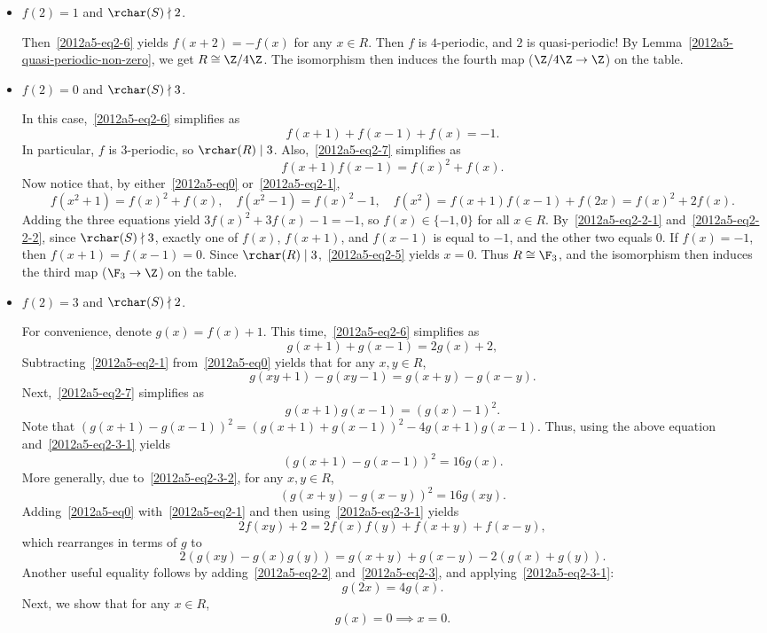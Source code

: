 \begin{itemize}

    \item 
    $f(2) = 1$ and $\rchar(S) \nmid 2$.

    Then~\eqref{2012a5-eq2-6} yields $f(x + 2) = -f(x)$ for any $x \in R$.
    Then $f$ is $4$-periodic, and $2$ is quasi-periodic!
    By Lemma~\ref{2012a5-quasi-periodic-non-zero}, we get $R \cong \Z/4\Z$.
    The isomorphism then induces the fourth map ($\Z/4\Z \to \Z$) on the table.


    \item
    $f(2) = 0$ and $\rchar(S) \nmid 3$.

    In this case,~\eqref{2012a5-eq2-6} simplifies as
    \[ f(x + 1) + f(x - 1) + f(x) = -1. \tag{2.2.1}\label{2012a5-eq2-2-1} \]
    In particular, $f$ is $3$-periodic, so $\rchar(R) \mid 3$.
    Also,~\eqref{2012a5-eq2-7} simplifies as
    \[ f(x + 1) f(x - 1) = f(x)^2 + f(x). \tag{2.2.2}\label{2012a5-eq2-2-2} \]
    Now notice that, by either~\eqref{2012a5-eq0} or~\eqref{2012a5-eq2-1},
    \[ f(x^2 + 1) = f(x)^2 + f(x), \quad f(x^2 - 1) = f(x)^2 - 1, \quad f(x^2) = f(x + 1) f(x - 1) + f(2x) = f(x)^2 + 2 f(x). \]
    Adding the three equations yield $3 f(x)^2 + 3 f(x) - 1 = -1$, so $f(x) \in \{-1, 0\}$ for all $x \in R$.
    By~\eqref{2012a5-eq2-2-1} and~\eqref{2012a5-eq2-2-2}, since $\rchar(S) \nmid 3$, exactly one of $f(x)$, $f(x + 1)$, and $f(x - 1)$ is equal to $-1$, and the other two equals $0$.
    If $f(x) = -1$, then $f(x + 1) = f(x - 1) = 0$.
    Since $\rchar(R) \mid 3$,~\eqref{2012a5-eq2-5} yields $x = 0$.
    Thus $R \cong \F_3$, and the isomorphism then induces the third map ($\F_3 \to \Z$) on the table.


    \item
    $f(2) = 3$ and $\rchar(S) \nmid 2$.

    For convenience, denote $g(x) = f(x) + 1$.
    This time,~\eqref{2012a5-eq2-6} simplifies as
    \[ g(x + 1) + g(x - 1) = 2 g(x) + 2, \tag{2.3.1}\label{2012a5-eq2-3-1} \]
    Subtracting~\eqref{2012a5-eq2-1} from~\eqref{2012a5-eq0} yields that for any $x, y \in R$,
    \[ g(xy + 1) - g(xy - 1) = g(x + y) - g(x - y). \tag{2.3.2}\label{2012a5-eq2-3-2} \]
    Next,~\eqref{2012a5-eq2-7} simplifies as
    \[ g(x + 1) g(x - 1) = (g(x) - 1)^2. \]
    Note that $(g(x + 1) - g(x - 1))^2 = (g(x + 1) + g(x - 1))^2 - 4 g(x + 1) g(x - 1)$.
    Thus, using the above equation and~\eqref{2012a5-eq2-3-1} yields
    \[ (g(x + 1) - g(x - 1))^2 = 16 g(x). \]
    More generally, due to~\eqref{2012a5-eq2-3-2}, for any $x, y \in R$,
    \[ (g(x + y) - g(x - y))^2 = 16 g(xy). \tag{2.3.3}\label{2012a5-eq2-3-3} \]
    Adding~\eqref{2012a5-eq0} with~\eqref{2012a5-eq2-1} and then using~\eqref{2012a5-eq2-3-1} yields
    \[ 2 f(xy) + 2 = 2 f(x) f(y) + f(x + y) + f(x - y), \]
        which rearranges in terms of $g$ to
    \[ 2(g(xy) - g(x) g(y)) = g(x + y) + g(x - y) - 2(g(x) + g(y)). \tag{2.3.4}\label{2012a5-eq2-3-4} \]
    Another useful equality follows by adding~\eqref{2012a5-eq2-2} and~\eqref{2012a5-eq2-3}, and applying~\eqref{2012a5-eq2-3-1}:
    \[ g(2x) = 4 g(x). \tag{2.3.5}\label{2012a5-eq2-3-5} \]
    Next, we show that for any $x \in R$,
    \[ g(x) = 0 \implies x = 0. \tag{2.3.6}\label{2012a5-eq2-3-6} \]


\end{itemize}
